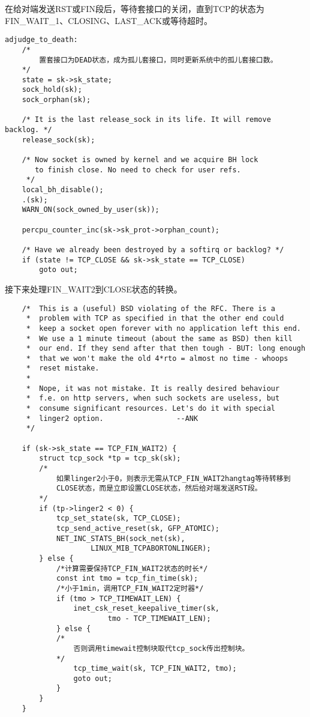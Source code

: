 	在给对端发送RST或FIN段后，等待套接口的关闭，直到TCP的状态为FIN\_WAIT\_1、CLOSING、LAST\_ACK或等待超时。
\begin{verbatim}
adjudge_to_death:
	/*
		置套接口为DEAD状态，成为孤儿套接口，同时更新系统中的孤儿套接口数。
	*/
    state = sk->sk_state;
    sock_hold(sk);
    sock_orphan(sk);

    /* It is the last release_sock in its life. It will remove backlog. */
    release_sock(sk);

    /* Now socket is owned by kernel and we acquire BH lock
       to finish close. No need to check for user refs.
     */
    local_bh_disable();
    .(sk);
    WARN_ON(sock_owned_by_user(sk));

    percpu_counter_inc(sk->sk_prot->orphan_count);

    /* Have we already been destroyed by a softirq or backlog? */
    if (state != TCP_CLOSE && sk->sk_state == TCP_CLOSE)
        goto out;
\end{verbatim}

	接下来处理FIN\_WAIT2到CLOSE状态的转换。
\begin{verbatim}
    /*  This is a (useful) BSD violating of the RFC. There is a
     *  problem with TCP as specified in that the other end could
     *  keep a socket open forever with no application left this end.
     *  We use a 1 minute timeout (about the same as BSD) then kill
     *  our end. If they send after that then tough - BUT: long enough
     *  that we won't make the old 4*rto = almost no time - whoops
     *  reset mistake.
     *
     *  Nope, it was not mistake. It is really desired behaviour
     *  f.e. on http servers, when such sockets are useless, but
     *  consume significant resources. Let's do it with special
     *  linger2 option.                 --ANK
     */

    if (sk->sk_state == TCP_FIN_WAIT2) {
        struct tcp_sock *tp = tcp_sk(sk);
		/*
			如果linger2小于0，则表示无需从TCP_FIN_WAIT2hangtag等待转移到
			CLOSE状态，而是立即设置CLOSE状态，然后给对端发送RST段。
		*/
        if (tp->linger2 < 0) {
            tcp_set_state(sk, TCP_CLOSE);
            tcp_send_active_reset(sk, GFP_ATOMIC);
            NET_INC_STATS_BH(sock_net(sk),
                    LINUX_MIB_TCPABORTONLINGER);
        } else {
			/*计算需要保持TCP_FIN_WAIT2状态的时长*/
            const int tmo = tcp_fin_time(sk);
			/*小于1min，调用TCP_FIN_WAIT2定时器*/
            if (tmo > TCP_TIMEWAIT_LEN) {
                inet_csk_reset_keepalive_timer(sk,
                        tmo - TCP_TIMEWAIT_LEN);
            } else {
			/*
				否则调用timewait控制块取代tcp_sock传出控制块。
			*/
                tcp_time_wait(sk, TCP_FIN_WAIT2, tmo);
                goto out;
            }
        }
    }
\end{verbatim}

